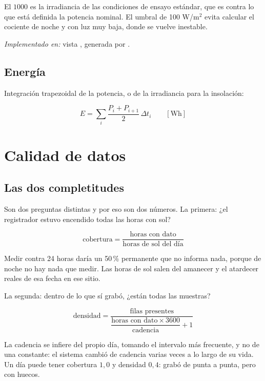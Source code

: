\documentclass[11pt,a4paper]{article}
\begin{document}
El $1000$ es la irradiancia de las condiciones de ensayo estándar, que es contra lo que
está definida la potencia nominal. El umbral de 100 W/m$^2$ evita calcular el cociente de
noche y con luz muy baja, donde se vuelve inestable.

\emph{Implementado en:} vista , generada por .

\subsection{Energía}

Integración trapezoidal de la potencia, o de la irradiancia para la insolación:

\begin{equation*}
  E = \sum_i \frac{P_i + P_{i+1}}{2}\,\Delta t_i
  \qquad [\mathrm{Wh}]
\end{equation*}

\section{Calidad de datos}

\subsection{Las dos completitudes}

Son dos preguntas distintas y por eso son dos números. La primera: ¿el registrador estuvo
encendido todas las horas con sol?

\begin{equation*}
  \text{cobertura} = \frac{\text{horas con dato}}{\text{horas de sol del día}}
\end{equation*}

Medir contra 24 horas daría un 50\,\% permanente que no informa nada, porque de noche no
hay nada que medir. Las horas de sol salen del amanecer y el atardecer reales de esa
fecha en ese sitio.

La segunda: dentro de lo que sí grabó, ¿están todas las muestras?

\begin{equation*}
  \text{densidad} = \frac{\text{filas presentes}}{\dfrac{\text{horas con dato} \times 3600}{\text{cadencia}} + 1}
\end{equation*}

La cadencia se infiere del propio día, tomando el intervalo más frecuente, y no de una
constante: el sistema cambió de cadencia varias veces a lo largo de su vida. Un día puede
tener cobertura $1{,}0$ y densidad $0{,}4$: grabó de punta a punta, pero con huecos.
\end{document}
